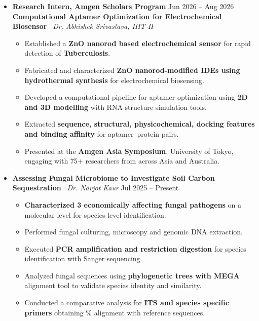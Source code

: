 \documentclass[letterpaper,9pt]{article}
\begin{document}
\begin{itemize}[leftmargin=0pt, parsep=0pt, itemsep=0.4em]
\item[] \textbf{Research Intern, Amgen Scholars Program} \hfill Jun 2026 -- Aug 2026\\
\textbf{Computational Aptamer Optimization for Electrochemical Biosensor} \textbar\ \textit{Dr. Abhishek Srivastava, IIIT-H}
{\small
\begin{itemize}[leftmargin=1em, label=\textbullet, itemsep=0.5pt, parsep=0pt, topsep=1pt]
\item Established a \textbf{ZnO nanorod based electrochemical sensor} for rapid detection of \textbf{Tuberculosis}.
\item Fabricated and characterized \textbf{ZnO nanorod-modified IDEs using hydrothermal synthesis} for electrochemical biosensing.
\item Developed a computational pipeline for aptamer optimization using \textbf{2D and 3D modelling} with RNA structure simulation tools.
\item Extracted \textbf{sequence, structural, physicochemical, docking features and binding affinity} for aptamer–protein pairs.  
\item Presented at the\textbf{ Amgen Asia Symposium}, University of Tokyo, engaging with 75+ researchers from across Asia and Australia.
\end{itemize}
}

\vspace{0.35em}

\item[] \textbf{Assessing Fungal Microbiome to Investigate Soil Carbon Sequestration} \textbar\ \textit{Dr. Navjot Kaur} \hfill Jul 2025 -- Present
{\small
\begin{itemize}[leftmargin=1em, label=\textbullet, itemsep=0.5pt, parsep=0pt, topsep=1pt]
\item \textbf{Characterized 3 economically affecting fungal pathogens} on a molecular level for species level identification.  
\item Performed fungal culturing, microscopy and genomic DNA extraction.
\item Executed \textbf{PCR amplification and restriction digestion} for species identification with Sanger sequencing. 
\item Analyzed fungal sequences using \textbf{phylogenetic trees with MEGA} alignment tool to validate species identity and similarity.
\item Conducted a comparative analysis for \textbf{ITS and species specific primers} obtaining \% alignment with reference sequences.
\end{itemize}
}


\end{itemize}
\end{document}
